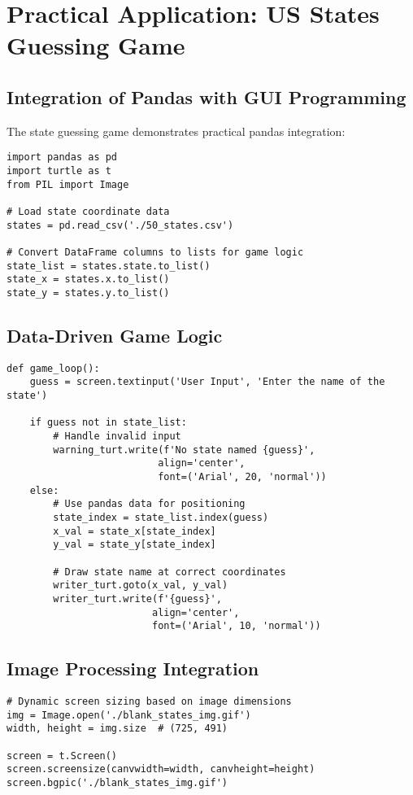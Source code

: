 \documentclass[12pt]{article}
\begin{document}
\section{Practical Application: US States Guessing Game}

\subsection{Integration of Pandas with GUI Programming}

The state guessing game demonstrates practical pandas integration:

\begin{lstlisting}
import pandas as pd
import turtle as t
from PIL import Image

# Load state coordinate data
states = pd.read_csv('./50_states.csv')

# Convert DataFrame columns to lists for game logic
state_list = states.state.to_list()
state_x = states.x.to_list()
state_y = states.y.to_list()
\end{lstlisting}

\subsection{Data-Driven Game Logic}

\begin{lstlisting}
def game_loop():
    guess = screen.textinput('User Input', 'Enter the name of the state')
    
    if guess not in state_list:
        # Handle invalid input
        warning_turt.write(f'No state named {guess}', 
                          align='center', 
                          font=('Arial', 20, 'normal'))
    else:
        # Use pandas data for positioning
        state_index = state_list.index(guess)
        x_val = state_x[state_index]
        y_val = state_y[state_index]
        
        # Draw state name at correct coordinates
        writer_turt.goto(x_val, y_val)
        writer_turt.write(f'{guess}', 
                         align='center', 
                         font=('Arial', 10, 'normal'))
\end{lstlisting}

\subsection{Image Processing Integration}

\begin{lstlisting}
# Dynamic screen sizing based on image dimensions
img = Image.open('./blank_states_img.gif')
width, height = img.size  # (725, 491)

screen = t.Screen()
screen.screensize(canvwidth=width, canvheight=height)
screen.bgpic('./blank_states_img.gif')
\end{lstlisting}
\end{document}
